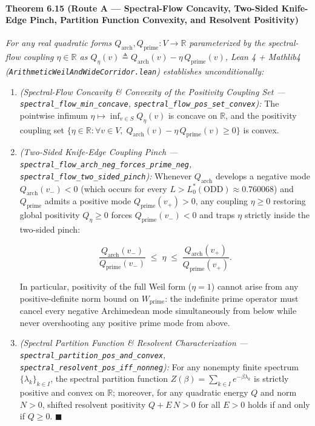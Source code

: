 \documentclass[
  11pt,
]{article}
\newcounter{none} %
\begin{document}
\paragraph{Theorem 6.15 (Route A --- Spectral-Flow Concavity, Two-Sided
Knife-Edge Pinch, Partition Function Convexity, and Resolvent
Positivity)}\label{theorem-6.15-route-a-spectral-flow-concavity-two-sided-knife-edge-pinch-partition-function-convexity-and-resolvent-positivity}

\emph{For any real quadratic forms
\(Q_{\text{arch}}, Q_{\text{prime}} : V \to \mathbb{R}\) parameterized
by the spectral-flow coupling \(\eta \in \mathbb{R}\) as
\(Q_\eta(v) \triangleq Q_{\text{arch}}(v) - \eta\, Q_{\text{prime}}(v)\),
Lean 4 + Mathlib4 (\texttt{ArithmeticWeilAndWideCorridor.lean})
establishes unconditionally:}

\begin{enumerate}
\def\labelenumi{\arabic{enumi}.}
\item
  \emph{(Spectral-Flow Concavity \& Convexity of the Positivity Coupling
  Set --- \texttt{spectral\_flow\_min\_concave},
  \texttt{spectral\_flow\_pos\_set\_convex}):} The pointwise infimum
  \(\eta \mapsto \inf_{v \in S} Q_\eta(v)\) is concave on
  \(\mathbb{R}\), and the positivity coupling set
  \(\{\eta \in \mathbb{R} : \forall v \in V,\; Q_{\text{arch}}(v) - \eta\, Q_{\text{prime}}(v) \ge 0\}\)
  is convex.
\item
  \emph{(Two-Sided Knife-Edge Coupling Pinch ---
  \texttt{spectral\_flow\_arch\_neg\_forces\_prime\_neg},
  \texttt{spectral\_flow\_two\_sided\_pinch}):} Whenever
  \(Q_{\text{arch}}\) develops a negative mode
  \(Q_{\text{arch}}(v_-) < 0\) (which occurs for every
  \(L > L_0^*(\text{ODD}) \approx 0.760068\)) and \(Q_{\text{prime}}\)
  admits a positive mode \(Q_{\text{prime}}(v_+) > 0\), any coupling
  \(\eta \ge 0\) restoring global positivity \(Q_\eta \ge 0\) forces
  \(Q_{\text{prime}}(v_-) < 0\) and traps \(\eta\) strictly inside the
  two-sided pinch:

  \[\frac{Q_{\text{arch}}(v_-)}{Q_{\text{prime}}(v_-)} \;\le\; \eta \;\le\; \frac{Q_{\text{arch}}(v_+)}{Q_{\text{prime}}(v_+)}.\]

  In particular, positivity of the full Weil form (\(\eta = 1\)) cannot
  arise from any positive-definite norm bound on \(W_{\text{prime}}\):
  the indefinite prime operator must cancel every negative Archimedean
  mode simultaneously from below while never overshooting any positive
  prime mode from above.
\item
  \emph{(Spectral Partition Function \& Resolvent Characterization ---
  \texttt{spectral\_partition\_pos\_and\_convex},
  \texttt{spectral\_resolvent\_pos\_iff\_nonneg}):} For any nonempty
  finite spectrum \(\{\lambda_k\}_{k \in I}\), the spectral partition
  function \(Z(\beta) = \sum_{k \in I} e^{-\beta \lambda_k}\) is
  strictly positive and convex on \(\mathbb{R}\); moreover, for any
  quadratic energy \(Q\) and norm \(N > 0\), shifted resolvent
  positivity \(Q + E\,N > 0\) for all \(E > 0\) holds if and only if
  \(Q \ge 0\). \(\blacksquare\)
\end{enumerate}
\end{document}
